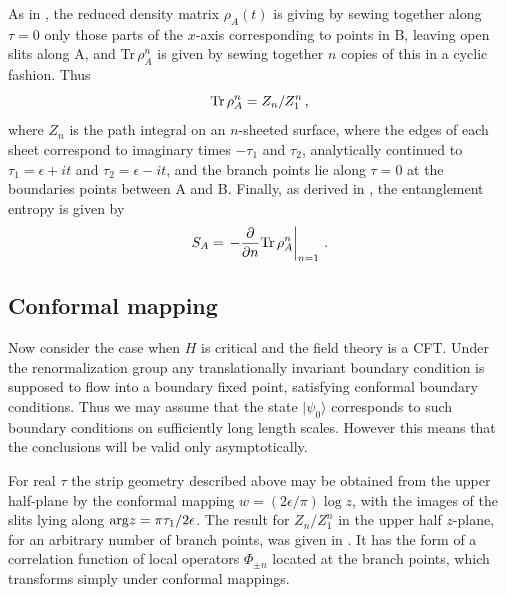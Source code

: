 \documentclass[12pt,preprint,tighten,eqsecnum,aps,floats,psfig,epsfig,amsmath,onecolumn]{revtex4-1}
\def\be{\begin{equation}}
\def\ee{\end{equation}}
\def\e{\epsilon}
\begin{document}
As in \cite{cc-04}, the reduced density matrix $\rho_A(t)$ is giving
by sewing together along $\tau=0$ only those parts of the $x$-axis
corresponding to points in B, leaving open slits along A, and
Tr$\,\rho_A^n$ is given by sewing together $n$ copies of this in a
cyclic fashion. Thus
\begin{equation}
{\rm Tr}\,\rho_A^n=Z_n/Z_1^n\,,
\end{equation}
where $Z_n$ is the path integral on an $n$-sheeted surface, where
the edges of each sheet correspond to imaginary times $-\tau_1$
and $\tau_2$, analytically continued to $\tau_1=\e+it$ and
$\tau_2=\e-it$, and the branch points lie along $\tau=0$ at
the boundaries points between A and B.
Finally, as derived in \cite{cc-04}, the entanglement entropy is given by
\be
S_A=\left.-\frac{\partial}{\partial n} {\rm Tr}\,\rho_A^n\right|_{n=1}\,.
\ee


\subsection{Conformal mapping}

Now consider the case when $H$ is critical and the field theory is
a CFT. Under the renormalization group any translationally
invariant boundary condition is supposed to flow into a boundary
fixed point, satisfying conformal boundary conditions. Thus we may
assume that the state $|\psi_0\rangle$ corresponds to such
boundary conditions on sufficiently long length scales. However
this means that the conclusions will be valid only asymptotically.

For real $\tau$ the strip geometry described above may be obtained
from the upper half-plane by the conformal mapping
$w=(2\e/\pi)\log z$, with the images of the slits lying along
${\rm arg} z=\pi\tau_1/2\e$. The result for $Z_n/Z_1^n$ in the
upper half $z$-plane, for an arbitrary number of branch points,
was given in \cite{cc-04}. It has the form of a correlation
function of local operators $\Phi_{\pm n}$ located at the branch
points, which transforms simply under conformal mappings.
\end{document}
